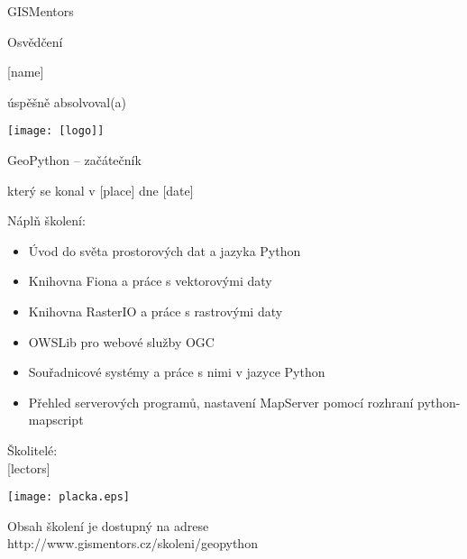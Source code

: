 \documentclass[12pt, a4paper]{letter}
\begin{document}
\pagestyle{empty}
\begin{center}

{\Large GISMentors}

{\Huge Osvědčení}

{\Large [name]}

úspěšně absolvoval(a)

\texttt{[image: [logo]]}

{\Large GeoPython -- začátečník}

který se konal v [place] dne [date]
\end{center}

Náplň školení:

\begin{itemize}
    \item Úvod do světa prostorových dat a jazyka Python
    \item Knihovna Fiona a práce s vektorovými daty
    \item Knihovna RasterIO a práce s rastrovými daty
    \item OWSLib pro webové služby OGC
    \item Souřadnicové systémy a práce s nimi v jazyce Python
    \item Přehled serverových programů, nastavení MapServer pomocí rozhraní
            python-mapscript
\end{itemize}

\vfill
\parbox{7cm}{

        Školitelé: \\

        [lectors]
}
\hfill
\parbox{3cm}{
    \texttt{[image: placka.eps]}
}

\vfill

\begin{center}
{\footnotesize Obsah školení je dostupný na adrese
http://www.gismentors.cz/skoleni/geopython}
\end{center}
\end{document}
